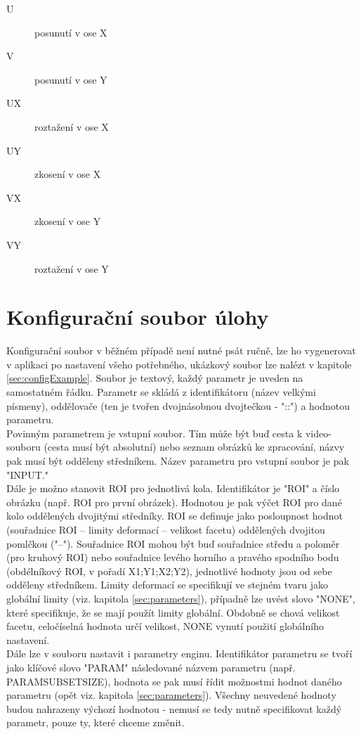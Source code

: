 \documentclass[a4paper,12pt]{article}
\begin{document}
\begin{description}
\begin{description}
\item[U] posunutí v ose X
\item[V] posunutí v ose Y
\item[UX] roztažení v ose X
\item[UY] zkosení v ose X
\item[VX] zkosení v ose Y
\item[VY] roztažení v ose Y
\end{description}
\end{description}
\newpage
\section{Konfigurační soubor úlohy}
\label{sec:config}
Konfigurační soubor v běžném případě není nutné psát ručně, lze ho vygenerovat v aplikaci po nastavení všeho potřebného, ukázkový soubor lze nalézt v kapitole \ref{sec:configExample}. Soubor je textový, každý parametr je uveden na samostatném řádku. Parametr se skládá z identifikátoru (název velkými písmeny), oddělovače (ten je tvořen dvojnásobnou dvojtečkou - "::") a hodnotou parametru.\\
Povinným parametrem je vstupní soubor. Tím může být buď cesta k video-souboru (cesta musí být absolutní) nebo seznam obrázků ke zpracování, názvy pak musí být odděleny středníkem. Název parametru pro vstupní soubor je pak "INPUT."\\
Dále je možno stanovit ROI pro jednotlivá kola. Identifikátor je "ROI\textunderscore " a číslo obrázku (např. ROI pro první obrázek). Hodnotou je pak výčet ROI pro dané kolo oddělených dvojitými středníky. ROI se definuje jako posloupnost hodnot (souřadnice ROI -- limity deformací -- velikost facetu) oddělených dvojitou pomlčkou ("--"). Souřadnice ROI mohou být buď souřadnice středu a poloměr (pro kruhový ROI) nebo souřadnice levého horního a pravého spodního bodu (obdélníkový ROI, v pořadí X1;Y1;X2;Y2), jednotlivé hodnoty jsou od sebe odděleny středníkem. Limity deformací se specifikují ve stejném tvaru jako globální limity (viz. kapitola \ref{sec:parameters}), případně lze uvést slovo "NONE", které specifikuje, že se mají použít limity globální. Obdobně se chová velikost facetu, celočíselná hodnota určí velikost, NONE vynutí použití globálního nastavení.\\
Dále lze v souboru nastavit i parametry enginu. Identifikátor parametru se tvoří jako klíčové slovo "PARAM\textunderscore" následované názvem parametru (např. PARAM\textunderscore SUBSET\textunderscore SIZE), hodnota se pak musí řídit možnostmi hodnot daného parametru (opět viz. kapitola \ref{sec:parameters}). Všechny neuvedené hodnoty budou nahrazeny výchozí hodnotou - nemusí se tedy nutně specifikovat každý parametr, pouze ty, které chceme změnit.\\
\end{document}
